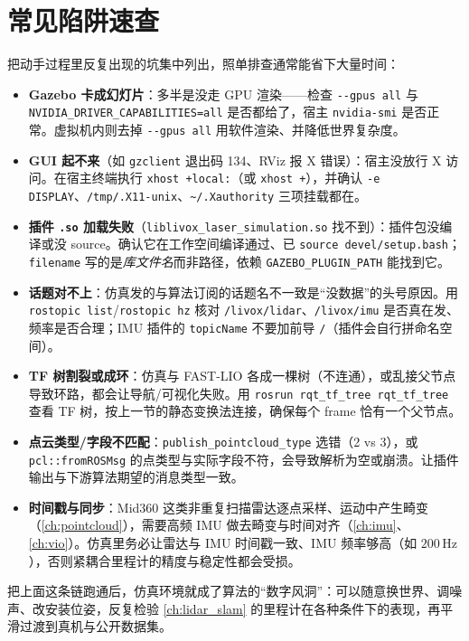 \section{常见陷阱速查}

把动手过程里反复出现的坑集中列出，照单排查通常能省下大量时间：

\begin{itemize}
  \item \textbf{Gazebo 卡成幻灯片}：多半是没走 GPU 渲染——检查 \verb|--gpus all| 与 \verb|NVIDIA_DRIVER_CAPABILITIES=all| 是否都给了，宿主 \verb|nvidia-smi| 是否正常。虚拟机内则去掉 \verb|--gpus all| 用软件渲染、并降低世界复杂度。
  \item \textbf{GUI 起不来}（如 \verb|gzclient| 退出码 134、RViz 报 X 错误）：宿主没放行 X 访问。在宿主终端执行 \verb|xhost +local:|（或 \verb|xhost +|），并确认 \verb|-e DISPLAY|、\verb|/tmp/.X11-unix|、\verb|~/.Xauthority| 三项挂载都在。
  \item \textbf{插件 \texttt{.so} 加载失败}（\verb|liblivox_laser_simulation.so| 找不到）：插件包没编译或没 source。确认它在工作空间编译通过、已 \verb|source devel/setup.bash|；\verb|filename| 写的是\emph{库文件名}而非路径，依赖 \verb|GAZEBO_PLUGIN_PATH| 能找到它。
  \item \textbf{话题对不上}：仿真发的与算法订阅的话题名不一致是“没数据”的头号原因。用 \verb|rostopic list|/\verb|rostopic hz| 核对 \verb|/livox/lidar|、\verb|/livox/imu| 是否真在发、频率是否合理；IMU 插件的 \verb|topicName| 不要加前导 \verb|/|（插件会自行拼命名空间）。
  \item \textbf{TF 树割裂或成环}：仿真与 FAST-LIO 各成一棵树（不连通），或乱接父节点导致环路，都会让导航/可视化失败。用 \verb|rosrun rqt_tf_tree rqt_tf_tree| 查看 TF 树，按上一节的静态变换法连接，确保每个 frame 恰有一个父节点。
  \item \textbf{点云类型/字段不匹配}：\verb|publish_pointcloud_type| 选错（2 vs 3），或 \verb|pcl::fromROSMsg| 的点类型与实际字段不符，会导致解析为空或崩溃。让插件输出与下游算法期望的消息类型一致。
  \item \textbf{时间戳与同步}：Mid360 这类非重复扫描雷达逐点采样、运动中产生畸变（\cref{ch:pointcloud}），需要高频 IMU 做去畸变与时间对齐（\cref{ch:imu}、\cref{ch:vio}）。仿真里务必让雷达与 IMU 时间戳一致、IMU 频率够高（如 $200\,\mathrm{Hz}$），否则紧耦合里程计的精度与稳定性都会受损。
\end{itemize}

把上面这条链跑通后，仿真环境就成了算法的“数字风洞”：可以随意换世界、调噪声、改安装位姿，反复检验 \cref{ch:lidar_slam} 的里程计在各种条件下的表现，再平滑过渡到真机与公开数据集。
